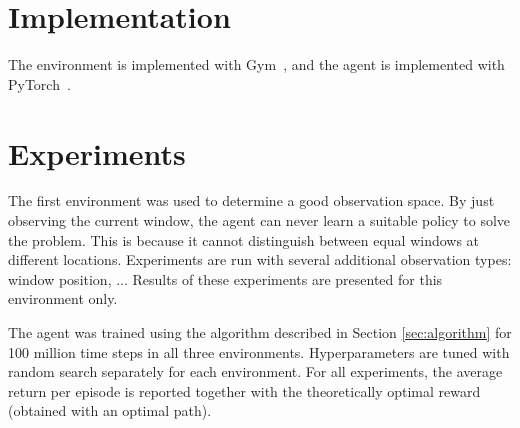 





\section{Implementation}

The environment is implemented with Gym~\cite{gym}, and the agent is implemented with PyTorch~\cite{pytorch}. 


\section{Experiments}

The first environment was used to determine a good observation space.
By just observing the current window, the agent can never learn a suitable policy to solve the problem.
This is because it cannot distinguish between equal windows at different locations.
Experiments are run with several additional observation types: window position, ...
Results of these experiments are presented for this environment only.

The agent was trained using the algorithm described in Section \ref{sec:algorithm} for 100 million time steps in all three environments.
Hyperparameters are tuned with random search separately for each environment.
For all experiments, the average return per episode is reported together with the theoretically optimal reward (obtained with an optimal path).

